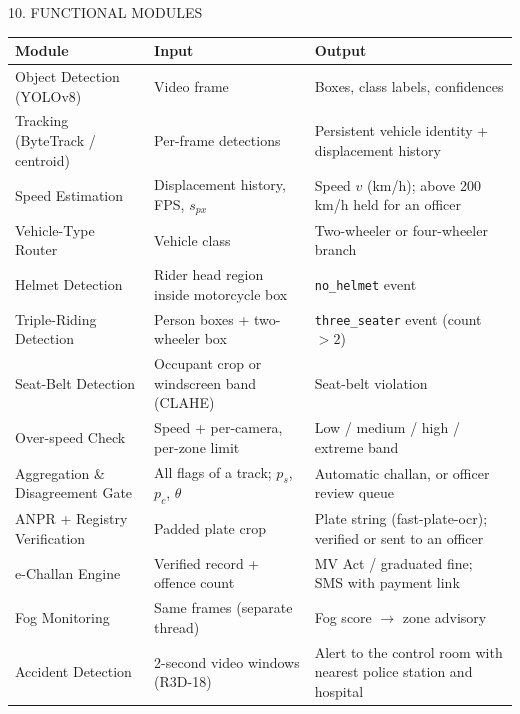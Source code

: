 \documentclass[aspectratio=169,10pt,t]{beamer}
\renewcommand{\arraystretch}{1.12}
\begin{document}
\begin{frame}{10. FUNCTIONAL MODULES}
\scriptsize
\renewcommand{\arraystretch}{1.05}
\centering
\begin{tabularx}{\textwidth}{@{}L{0.24\textwidth}L{0.33\textwidth}Y@{}}
\toprule
\textbf{Module} & \textbf{Input} & \textbf{Output}\\
\midrule
Object Detection (YOLOv8)       & Video frame                                & Boxes, class labels, confidences\\
Tracking (ByteTrack / centroid) & Per-frame detections                       & Persistent vehicle identity + displacement history\\
Speed Estimation                & Displacement history, FPS, $s_{px}$        & Speed $v$ (km/h); above 200 km/h held for an officer\\
Vehicle-Type Router             & Vehicle class                              & Two-wheeler or four-wheeler branch\\
Helmet Detection                & Rider head region inside motorcycle box    & \texttt{no\_helmet} event\\
Triple-Riding Detection         & Person boxes + two-wheeler box             & \texttt{three\_seater} event (count $>2$)\\
Seat-Belt Detection             & Occupant crop or windscreen band (CLAHE)   & Seat-belt violation\\
Over-speed Check                & Speed + per-camera, per-zone limit         & Low / medium / high / extreme band\\
Aggregation \& Disagreement Gate& All flags of a track; $p_s$, $p_c$, $\theta$ & Automatic challan, or officer review queue\\
ANPR + Registry Verification    & Padded plate crop                          & Plate string (fast-plate-ocr); verified or sent to an officer\\
e-Challan Engine                & Verified record + offence count            & MV Act / graduated fine; SMS with payment link\\
Fog Monitoring                  & Same frames (separate thread)              & Fog score $\rightarrow$ zone advisory\\
Accident Detection              & 2-second video windows (R3D-18)            & Alert to the control room with nearest police station and hospital\\
\bottomrule
\end{tabularx}
\end{frame}
\end{document}

